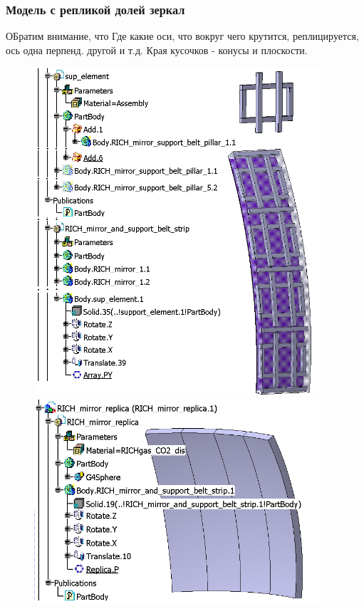 \subsubsection{Модель с репликой долей зеркал}\label{sec:secModelWithReplMirrors}

ОБратим внимание, что
Где какие оси, что вокруг чего крутится, реплицируется, ось одна перпенд. другой и т.д.
Края кусочков - конусы и плоскости.

\begin{figure}[H]
\begin{minipage}[t]{0.495\textwidth}
\includegraphics[width=0.95\textwidth]{pictures/CbmRichMirror1.png}
\end{minipage}
\hspace{0.01\textwidth}
\begin{minipage}[t]{0.495\textwidth}
\includegraphics[width=0.95\textwidth]{pictures/CbmRichMirror2.png}
\end{minipage}
\caption{}
\label{fig:ReplicaMirror}
\end{figure}
